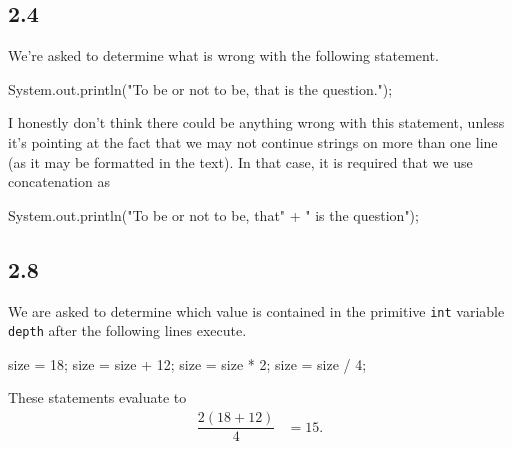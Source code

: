 \documentclass[leqno, 11pt]{article}
\begin{document}
\subsection*{2.4}
We're asked to determine what is wrong with the following statement.
\begin{verbbox}
System.out.println("To be or not to be, that is the question.");
\end{verbbox}
\begin{center}
\theverbbox
\end{center}
I honestly don't think there could be anything wrong with this statement, unless it's pointing at the fact that we may not continue strings on more than one line (as it may be formatted in the text). In that case, it is required that we use concatenation as
\begin{verbbox}
System.out.println("To be or not to be, that"
    + " is the question");
\end{verbbox}
\begin{center}
\theverbbox
\end{center}
\subsection*{2.8}
We are asked to determine which value is contained in the primitive \texttt{int} variable \texttt{depth} after the following lines execute.
\begin{verbbox}
size = 18;
size = size + 12;
size = size * 2;
size = size / 4;
\end{verbbox}
\begin{center}
\theverbbox
\end{center}
These statements evaluate to
\begin{align*}
\dfrac{2\left(18 + 12\right)}{4}&=\boxed{15.}
\end{align*}
\end{document}
